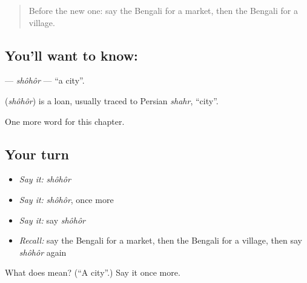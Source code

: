 \label{lesson:BN-C84-shohor}



\begin{quote}
Before the new one: say the Bengali for a market, then the Bengali for a village.
\end{quote}

\subsection*{You'll want to know: }
\textbf{} — \emph{shôhôr} — \textquotedblleft{}a city\textquotedblright{}.

\begin{cousinweb}
\textbf{} (\emph{shôhôr}) is a loan, usually traced to Persian \emph{shahr}, \textquotedblleft{}city\textquotedblright{}.
\end{cousinweb}

\begin{grammarlens}[title={What you've built}]
One more word for this chapter.
\end{grammarlens}

\subsection*{Your turn}
\begin{itemize}
\raggedright
  \item \emph{Say it:} \emph{shôhôr}
  \item \emph{Say it:} \emph{shôhôr}, once more
  \item \emph{Say it:} say \emph{shôhôr}
  \item \emph{Recall:} say the Bengali for a market, then the Bengali for a village, then say \emph{shôhôr} again
\end{itemize}

\begin{tcolorbox}[breakable,colback=teal!4,colframe=teal!35!black,title={Before you move on}]
What does  mean? (\textquotedblleft{}A city\textquotedblright{}.) Say it once more.
\end{tcolorbox}

